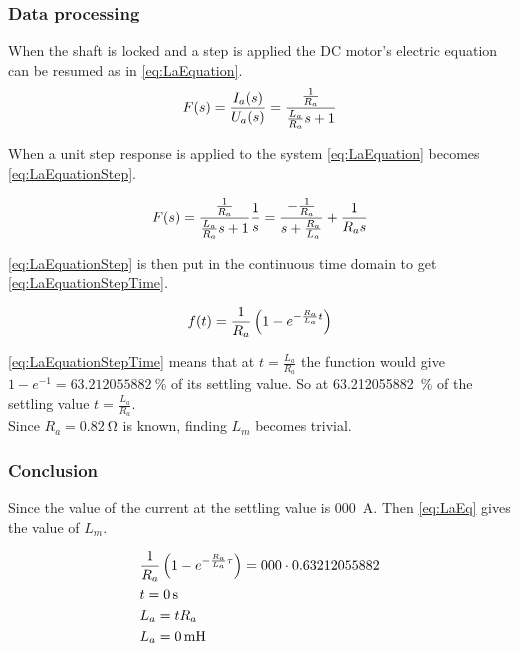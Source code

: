 \subsubsection*{Data processing}
When the shaft is locked and a step is applied the DC motor's electric equation can be resumed as in \autoref{eq:LaEquation}.
\begin{equation}
	F(s)=\frac{I_a(s)}{U_a(s)}=\frac{\frac{1}{R_a}}{\frac{L_a}{R_a} s+1} \addunit{1}
	\label{eq:LaEquation}
\end{equation}
\startexplain
{}
\stopexplain

When a unit step response is applied to the system \autoref{eq:LaEquation} becomes \autoref{eq:LaEquationStep}.

\begin{equation}
F(s)=\frac{\frac{1}{R_a}}{\frac{L_a}{R_a} s+1}\frac{1}{s}=\frac{-\frac{1}{R_a}}{s+\frac{R_a}{L_a}}+\frac{1}{R_a s} \addunit{1}
\label{eq:LaEquationStep}
\end{equation}

\autoref{eq:LaEquationStep} is then put in the continuous time domain to get \autoref{eq:LaEquationStepTime}.

\begin{equation}
f(t)= \frac{1}{R_a} \left(1-e^{-\frac{R_a}{L_a} t}\right) \addunit{1}
\label{eq:LaEquationStepTime}
\end{equation}

\autoref{eq:LaEquationStepTime} means that at $t=\frac{L_a}{R_a}$ the function would give $1-e^{-1}=\SI{63.212055882}{\percent}$ of its settling value. So at \SI{63.212055882}{\percent} of the settling value $t=\frac{L_a}{R_a}$. \\
Since $R_a=\SI{0.82}{\ohm}$ is known, finding $L_m$ becomes trivial.

\subsubsection*{Conclusion}

Since the value of the current at the settling value is \SI{000}{\ampere}. Then \autoref{eq:LaEq} gives the value of $L_m$.

\begin{subequations} \label{eq:LaEq}
	\begin{flalign}
		&\frac{1}{R_a} \left(1-e^{-\frac{R_a}{L_a} \tau}\right)=000 \cdot 0.63212055882 \addunit{\second} \\
		&t = \SI{000}{\second} \\
		&L_a=tR_a \\
		&L_a=\SI{000}{\milli\henry}
	\end{flalign}
\end{subequations}
